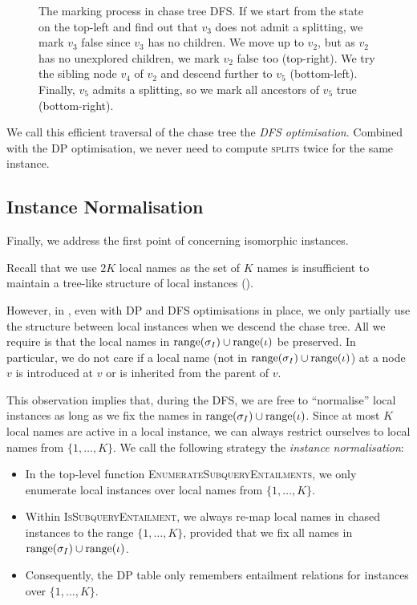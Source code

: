 \documentclass[12pt]{report}
\theoremstyle{plain}
\theoremstyle{definition}
\newcommand{\range}[1]{\ensuremath{\normalfont{\operatorname{range}}\!\left( #1 \right)}}
\begin{document}
\begin{figure}[t]
  \centering
  
  \caption{The marking process in chase tree DFS. If we start from the state on the top-left and find out that $v_3$ does not admit a splitting, we mark $v_3$ false since $v_3$ has no children. We move up to $v_2$, but as $v_2$ has no unexplored children, we mark $v_2$ false too (top-right). We try the sibling node $v_4$ of $v_2$ and descend further to $v_5$ (bottom-left). Finally, $v_5$ admits a splitting, so we mark all ancestors of $v_5$ true (bottom-right).}
  \label{figure:sctree-dfs-marking}
\end{figure}

We call this efficient traversal of the chase tree the \emph{DFS optimisation}. Combined with the DP optimisation, we never need to compute \textsc{splits} twice for the same instance.

\subsection{Instance Normalisation}
\label{subsection:instance-normalisation}

Finally, we address the first point of  concerning isomorphic instances.

Recall that we use $2K$ local names as the set of $K$ names is insufficient to maintain a tree-like structure of local instances ().

However, in , even with DP and DFS optimisations in place, we only partially use the structure between local instances when we descend the chase tree. All we require is that the local names in $\range{\sigma_I} \cup \range{\iota}$ be preserved. In particular, we do not care if a local name (not in $\range{\sigma_I} \cup \range{\iota}$) at a node $v$ is introduced at $v$ or is inherited from the parent of $v$.

This observation implies that, during the DFS, we are free to ``normalise'' local instances as long as we fix the names in $\range{\sigma_I} \cup \range{\iota}$. Since at most $K$ local names are active in a local instance, we can always restrict ourselves to local names from $\{ 1, \ldots, K \}$. We call the following strategy the \emph{instance normalisation}:

\begin{itemize}
  \item In the top-level function \textsc{EnumerateSubqueryEntailments}, we only enumerate local instances over local names from $\{ 1, \ldots, K \}$. 
  \item Within \textsc{IsSubqueryEntailment}, we always re-map local names in chased instances to the range $\{ 1, \ldots, K \}$, provided that we fix all names in $\range{\sigma_I} \cup \range{\iota}$.
  \item Consequently, the DP table only remembers entailment relations for instances over $\{ 1, \ldots, K \}$.
\end{itemize}
\end{document}
